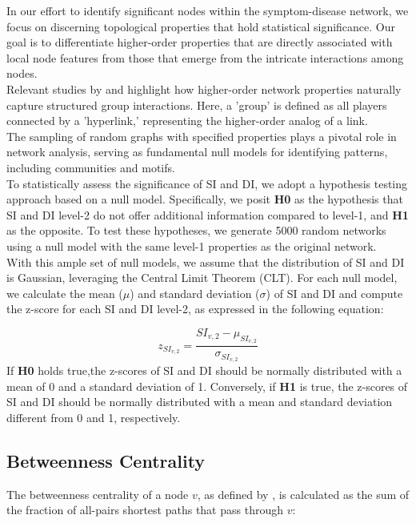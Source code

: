In our effort to identify significant nodes within the symptom-disease network,
we focus on discerning topological properties that hold statistical significance.
Our goal is to differentiate higher-order properties that are directly associated with local node features from those
that emerge from the intricate interactions among nodes.\\
Relevant studies by \citeauthor{Squartini_2011_a} \cite{Squartini_2011_a, Squartini_2011_b} and \citeauthor{Spelta_2023} \cite{Spelta_2023}
highlight how higher-order network properties naturally capture structured group interactions.
Here, a 'group' is defined as all players connected by a 'hyperlink,' representing the higher-order analog of a link.\\
The sampling of random graphs with specified properties plays a pivotal role in network analysis,
serving as fundamental null models for identifying patterns, including communities and motifs.\\
To statistically assess the significance of SI and DI, we adopt a hypothesis testing approach based on a null model.
Specifically, we posit \textbf{H0} as the hypothesis that SI and DI level-2 do not offer additional information compared to level-1,
and \textbf{H1} as the opposite.
To test these hypotheses, we generate 5000 random networks using a null model with the same level-1 properties as the original network.\\
With this ample set of null models, we assume that the distribution of SI and DI is Gaussian, leveraging the Central Limit Theorem (CLT).
For each null model, we calculate the mean ($\mu$) and standard deviation ($\sigma$) of SI and DI and compute the z-score for each SI and DI level-2,
as expressed in the following equation:

\begin{equation}
    z_{SI_{v, 2}} = \frac{SI_{v, 2} - \mu_{SI_{v, 2}}}{\sigma_{SI_{v, 2}}}
\end{equation}
\noindent
If \textbf{H0} holds true,the z-scores of SI and DI should be normally distributed with a mean of 0 and a standard deviation of 1.
Conversely, if \textbf{H1} is true, the z-scores of SI and DI should be normally distributed with a mean and standard deviation different from 0 and 1,
respectively.



\subsection{Betweenness Centrality}
The betweenness centrality of a node \(v\), as defined by  \cite{Brandes_2008},
is calculated as the sum of the fraction of all-pairs shortest paths that pass through \(v\):


